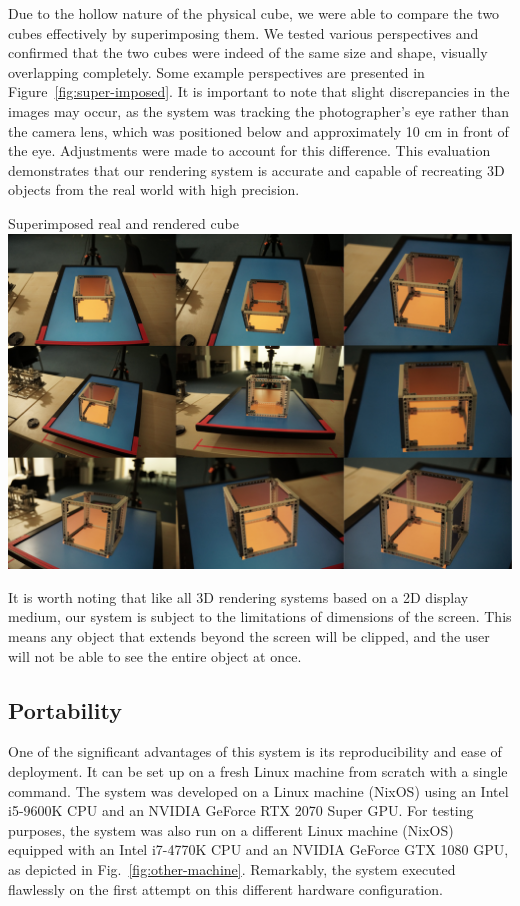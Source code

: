 Due to the hollow nature of the physical cube, we were able to compare the two cubes effectively by superimposing them. We tested various perspectives and confirmed that the two cubes were indeed of the same size and shape, visually overlapping completely. Some example perspectives are presented in Figure~\ref{fig:super-imposed}. It is important to note that slight discrepancies in the images may occur, as the system was tracking the photographer's eye rather than the camera lens, which was positioned below and approximately 10 cm in front of the eye. Adjustments were made to account for this difference. This evaluation demonstrates that our rendering system is accurate and capable of recreating 3D objects from the real world with high precision.

\begin{figureBox}[label={fig:super-imposed}, width=1.0\linewidth]{Superimposed real and rendered cube}
	\includegraphics[width = 1.0\linewidth]{./evaluation/figures/super-imposed.pdf}
\end{figureBox}

It is worth noting that like all 3D rendering systems based on a 2D display medium, our system is subject to the limitations of dimensions of the screen. This means any object that extends beyond the screen will be clipped, and the user will not be able to see the entire object at once.

\subsection{Portability}
One of the significant advantages of this system is its reproducibility and ease of deployment. It can be set up on a fresh Linux machine from scratch with a single command. The system was developed on a Linux machine (NixOS) using an Intel i5-9600K CPU and an NVIDIA GeForce RTX 2070 Super GPU. For testing purposes, the system was also run on a different Linux machine (NixOS) equipped with an Intel i7-4770K CPU and an NVIDIA GeForce GTX 1080 GPU, as depicted in Fig.~\ref{fig:other-machine}. Remarkably, the system executed flawlessly on the first attempt on this different hardware configuration.

